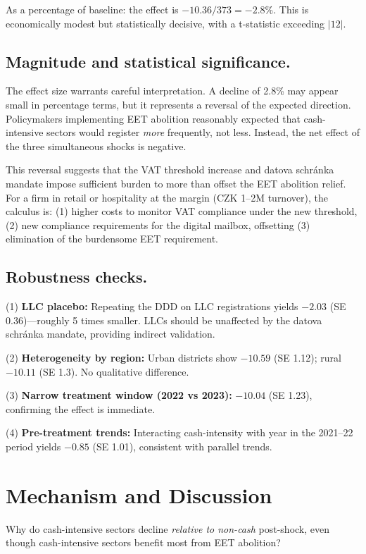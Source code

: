 \documentclass[12pt]{article}
\begin{document}
As a percentage of baseline: the effect is $-10.36 / 373 = -2.8\%$. This is economically modest but statistically decisive, with a t-statistic exceeding $|12|$.

\subsection*{Magnitude and statistical significance.}
The effect size warrants careful interpretation. A decline of 2.8\% may appear small in percentage terms, but it represents a reversal of the expected direction. Policymakers implementing EET abolition reasonably expected that cash-intensive sectors would register \emph{more} frequently, not less. Instead, the net effect of the three simultaneous shocks is negative.

This reversal suggests that the VAT threshold increase and datova schr\'anka mandate impose sufficient burden to more than offset the EET abolition relief. For a firm in retail or hospitality at the margin (CZK 1--2M turnover), the calculus is: (1) higher costs to monitor VAT compliance under the new threshold, (2) new compliance requirements for the digital mailbox, offsetting (3) elimination of the burdensome EET requirement.

\subsection*{Robustness checks.}
(1) \textbf{LLC placebo:} Repeating the DDD on LLC registrations yields $-2.03$ (SE 0.36)—roughly 5 times smaller. LLCs should be unaffected by the datova schr\'{a}nka mandate, providing indirect validation.

(2) \textbf{Heterogeneity by region:} Urban districts show $-10.59$ (SE 1.12); rural $-10.11$ (SE 1.3). No qualitative difference.

(3) \textbf{Narrow treatment window (2022 vs 2023):} $-10.04$ (SE 1.23), confirming the effect is immediate.

(4) \textbf{Pre-treatment trends:} Interacting cash-intensity with year in the 2021--22 period yields $-0.85$ (SE 1.01), consistent with parallel trends.

\section{Mechanism and Discussion}

Why do cash-intensive sectors decline \emph{relative to non-cash} post-shock, even though cash-intensive sectors benefit most from EET abolition?
\end{document}
